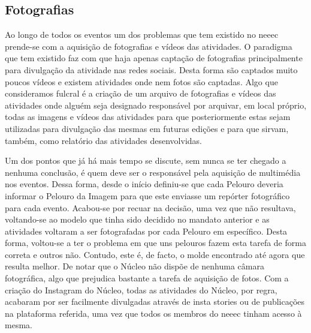 
\subsection{Fotografias}

Ao longo de todos os eventos um dos problemas que tem existido no \acrshort{neeec} prende-se com a aquisição de fotografias e vídeos das atividades. O paradigma que tem existido faz com que haja apenas captação de fotografias principalmente para divulgação da atividade nas redes sociais. Desta forma são captados muito poucos vídeos e existem atividades onde nem fotos são captadas. Algo que consideramos fulcral é a criação de um arquivo de fotografias e vídeos das atividades onde alguém seja designado responsável por arquivar, em local próprio, todas as imagens e vídeos das atividades para que posteriormente estas sejam utilizadas para divulgação das mesmas em futuras edições e para que sirvam, também, como relatório das atividades desenvolvidas.

Um dos pontos que já há mais tempo se discute, sem nunca se ter chegado a nenhuma conclusão, é quem deve ser o responsável pela aquisição de multimédia nos eventos. Dessa forma, desde o início definiu-se que cada Pelouro deveria informar o Pelouro da Imagem para que este enviasse um repórter fotográfico para cada evento. Acabou-se por recuar na decisão, uma vez que não resultava, voltando-se ao modelo que tinha sido decidido no mandato anterior e as atividades voltaram a ser fotografadas por cada Pelouro em específico. Desta forma, voltou-se a ter o problema em que uns pelouros fazem esta tarefa de forma correta e outros não. Contudo, este é, de facto, o molde encontrado até agora que resulta melhor. De notar que o Núcleo não dispõe de nenhuma câmara fotográfica, algo que prejudica bastante a tarefa de aquisição de fotos. Com a criação do Instagram do Núcleo, todas as atividades do Núcleo, por regra, acabaram por ser facilmente divulgadas através de insta stories ou de publicações na plataforma referida, uma vez que todos os membros do \acrshort{neeec} tinham acesso à mesma.